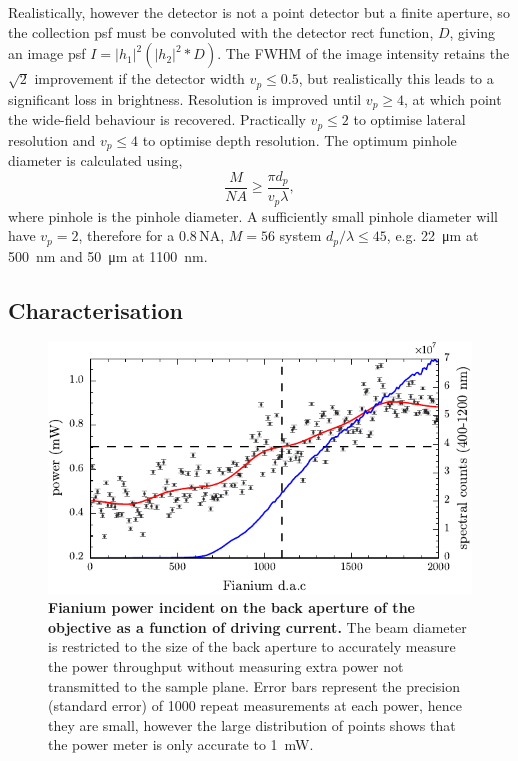 \documentclass{article}
\begin{document}
Realistically, however the detector is not a point detector but a finite aperture, so the collection \gls{psf} must be convoluted with the detector rect function, $D$, giving an image \gls{psf} $I=|h_1|^2(|h_2|^2\ast D)$. The FWHM of the image intensity retains the $\sqrt{2}$ improvement if the detector width $v_p\leq0.5$, but realistically this leads to a significant loss in brightness. Resolution is improved until $v_p\geq4$, at which point the wide-field behaviour is recovered. Practically $v_p\leq2$ to optimise lateral resolution and $v_p\leq4$ to optimise depth resolution. The optimum pinhole diameter is calculated using,
\begin{equation} \frac{M}{\mathit{NA}}\geq\frac{\pi d_p}{v_p\lambda}, \end{equation}
where \gls{pinhole} is the pinhole diameter. A sufficiently small pinhole diameter will have $v_p=2$, therefore for a 0.8\,NA, $M=56$ system $d_p/\lambda\leq45$, e.g. \SI{22}{\micro\metre} at \SI{500}{nm} and \SI{50}{\micro\metre} at \SI{1100}{nm}.

\subsection{Characterisation}

\begin{figure}[h]
\centering
\includegraphics{figures/fianium_power}
\caption*
{\textbf{Fianium power incident on the back aperture of the objective as a function of driving current.} The beam diameter is restricted to the size of the back aperture to accurately measure the power throughput without measuring extra power not transmitted to the sample plane. Error bars represent the precision (standard error) of 1000 repeat measurements at each power, hence they are small, however the large distribution of points shows that the power meter is only accurate to \SI{1}{mW}.}
\label{fig:fianium_power}
\end{figure}
\end{document}
